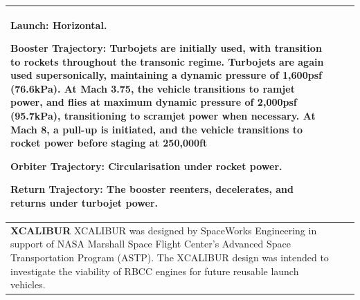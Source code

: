 {\begin{landscape}
\begin{xltabular}{\linewidth}{|X|X|X|}
	\textbf{Launch:} Horizontal.
	
	\textbf{Booster Trajectory:} Turbojets are initially used, with transition to rockets throughout the transonic regime. Turbojets are again used supersonically, maintaining a dynamic pressure of 1,600psf (76.6kPa). At Mach 3.75, the vehicle transitions to ramjet power, and flies at maximum dynamic pressure of 2,000psf (95.7kPa), transitioning to scramjet power when necessary. At Mach 8, a pull-up is initiated, and the vehicle transitions to rocket power before staging at 250,000ft
	
	\textbf{Orbiter Trajectory:}  Circularisation under rocket power. 
	
	\textbf{Return Trajectory:} The booster reenters, decelerates, and returns under turbojet power.  
	\\
	
	\hline \small 
	\textbf{XCALIBUR}\cite{Bradford2002}\newline\newline
	XCALIBUR was designed by SpaceWorks Engineering in support of NASA Marshall Space Flight Center’s Advanced Space Transportation Program (ASTP). The XCALIBUR design was intended to investigate the viability of RBCC engines for future reusable launch vehicles. 
	&\small
	

\end{xltabular}
\end{landscape}}
